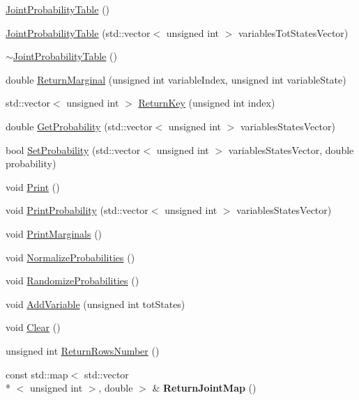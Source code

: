 \begin{DoxyCompactItemize}
\item 
\hyperlink{classbayonet_1_1_joint_probability_table_abc02930b72bf85bde3981e422e8676e0}{Joint\-Probability\-Table} ()
\item 
\hyperlink{classbayonet_1_1_joint_probability_table_afedab5cdff76623e341a9e8075a5867b}{Joint\-Probability\-Table} (std\-::vector$<$ unsigned int $>$ variables\-Tot\-States\-Vector)
\item 
\hyperlink{classbayonet_1_1_joint_probability_table_a5abe5ffb7ad2b6c4525e58b8ed6d7595}{$\sim$\-Joint\-Probability\-Table} ()
\item 
double \hyperlink{classbayonet_1_1_joint_probability_table_a90538c4bf67f0270b705caa26fea742b}{Return\-Marginal} (unsigned int variable\-Index, unsigned int variable\-State)
\item 
std\-::vector$<$ unsigned int $>$ \hyperlink{classbayonet_1_1_joint_probability_table_a0bcd0ebffb4d8fd6403759c55de62f9b}{Return\-Key} (unsigned int index)
\item 
double \hyperlink{classbayonet_1_1_joint_probability_table_a6b43b8414444f81a8013d34837d191af}{Get\-Probability} (std\-::vector$<$ unsigned int $>$ variables\-States\-Vector)
\item 
bool \hyperlink{classbayonet_1_1_joint_probability_table_a69554f2b857ee778d2d2aff7cefa0d1e}{Set\-Probability} (std\-::vector$<$ unsigned int $>$ variables\-States\-Vector, double probability)
\item 
void \hyperlink{classbayonet_1_1_joint_probability_table_ade691120f2a61325b94a7f9e85dd21f8}{Print} ()
\item 
void \hyperlink{classbayonet_1_1_joint_probability_table_ac52835cb75b2d635b51843abf58311a9}{Print\-Probability} (std\-::vector$<$ unsigned int $>$ variables\-States\-Vector)
\item 
void \hyperlink{classbayonet_1_1_joint_probability_table_a73e7e3843c63192e37d11bd9916f0587}{Print\-Marginals} ()
\item 
void \hyperlink{classbayonet_1_1_joint_probability_table_aa244b70256292fd00f8cd7bf1e8e7ed1}{Normalize\-Probabilities} ()
\item 
void \hyperlink{classbayonet_1_1_joint_probability_table_a91133b2cf610076459a641b458c898cd}{Randomize\-Probabilities} ()
\item 
void \hyperlink{classbayonet_1_1_joint_probability_table_a34def84ddda0e58303d552055057b884}{Add\-Variable} (unsigned int tot\-States)
\item 
void \hyperlink{classbayonet_1_1_joint_probability_table_a61a82adc62427272e5aa84ace3fc15a6}{Clear} ()
\item 
unsigned int \hyperlink{classbayonet_1_1_joint_probability_table_af87920fcfa20657c2c3eb816a77ea66b}{Return\-Rows\-Number} ()
\item 
\hypertarget{classbayonet_1_1_joint_probability_table_a6172ff11f3cc9e2f6eb0ae42eb3fcb47}{const std\-::map$<$ std\-::vector\\*
$<$ unsigned int $>$, double $>$ \& {\bfseries Return\-Joint\-Map} ()}\label{classbayonet_1_1_joint_probability_table_a6172ff11f3cc9e2f6eb0ae42eb3fcb47}

\end{DoxyCompactItemize}



